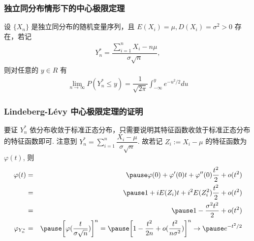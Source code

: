 \begin{frame}
	\frametitle{独立同分布情形下的中心极限定理}
	\begin{thm} 设 $\{X_n\}$ 是独立同分布的随机变量序列，且 $E (X_i)=\mu, D (X_i)=\sigma^2>0$ 存在，若记
		\begin{eqnarray*}
			Y_n^*=\dfrac{\sum_{i=1}^nX_i-n\mu}{\sigma\sqrt{n}},
		\end{eqnarray*}
		则对任意的 $y\in R$ 有
		\begin{eqnarray*}
			\lim_{n\rightarrow\infty}P(Y_n^*\le y)=\dfrac{1}{\sqrt{2\pi}}\int_{-\infty}^ye^{-u^2/2}du
		\end{eqnarray*}

	\end{thm}
\end{frame}
\begin{frame}
	\frametitle{Lindeberg-L{\'e}vy 中心极限定理的证明}
	\zheng 要证 $Y_n^*$ 依分布收敛于标准正态分布，只需要说明其特征函数收敛于标准正态分布的特征函数即可. \pause 注意到 $Y_n^*=\sum_{i=1}^n\dfrac{X_i-\mu}{\sigma\sqrt{n}}$. 故若记 $Z_i:=X_i-\mu$ 的特征函数为 $\varphi (t)$, 则
	\begin{eqnarray*}
		\varphi(t)&=&\pause \varphi(0)+\varphi'(0)t+\varphi''(0)\frac{t^2}{2}+o(t^2)\\
		&=&\pause 1+iE(Z_i)t+i^2E(Z_i^2)\frac{t^2}{2}+o(t^2)\\
		&=&\pause 1-\frac{\sigma^2t^2}{2}+o(t^2)\\
		\varphi_{Y_n^*}&=&\pause \bigg[\varphi(\frac{t}{\sigma\sqrt{n}})\bigg]^n=\pause \bigg[1-\frac{t^2}{2n}+o(\frac{t^2}{n\sigma^2})\bigg]^n\rightarrow \pause e^{-t^2/2}
	\end{eqnarray*}

\end{frame}

